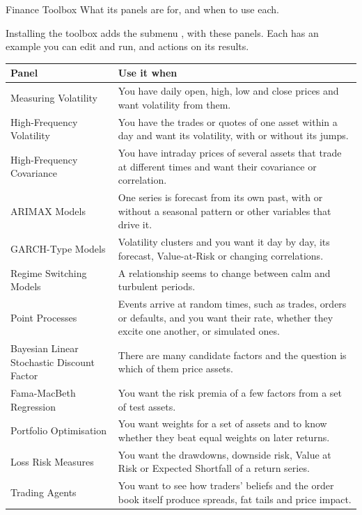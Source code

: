 
\renewcommand{\vignetteauthor}{Pollis}
\renewcommand{\vignettedate}{17 November 2026}
\renewcommand{\vignettelicense}{AGPL-3.0}



  {Finance Toolbox}
  {What its panels are for, and when to use each.}

Installing the toolbox adds the submenu , with these panels. Each has an example you can edit and run, and actions on its results.

\medskip
{\small
\begin{tabularx}{\linewidth}{@{}>{\raggedright\arraybackslash}p{62mm}X@{}}
\toprule
\textbf{Panel} & \textbf{Use it when} \\\midrule
Measuring Volatility & You have daily open, high, low and close prices and want volatility from them. \\
High-Frequency Volatility & You have the trades or quotes of one asset within a day and want its volatility, with or without its jumps. \\
High-Frequency Covariance & You have intraday prices of several assets that trade at different times and want their covariance or correlation. \\
ARIMAX Models & One series is forecast from its own past, with or without a seasonal pattern or other variables that drive it. \\
GARCH-Type Models & Volatility clusters and you want it day by day, its forecast, Value-at-Risk or changing correlations. \\
Regime Switching Models & A relationship seems to change between calm and turbulent periods. \\
Point Processes & Events arrive at random times, such as trades, orders or defaults, and you want their rate, whether they excite one another, or simulated ones. \\
Bayesian Linear Stochastic Discount Factor & There are many candidate factors and the question is which of them price assets. \\
Fama-MacBeth Regression & You want the risk premia of a few factors from a set of test assets. \\
Portfolio Optimisation & You want weights for a set of assets and to know whether they beat equal weights on later returns. \\
Loss Risk Measures & You want the drawdowns, downside risk, Value at Risk or Expected Shortfall of a return series. \\
Trading Agents & You want to see how traders' beliefs and the order book itself produce spreads, fat tails and price impact. \\\bottomrule
\end{tabularx}}


